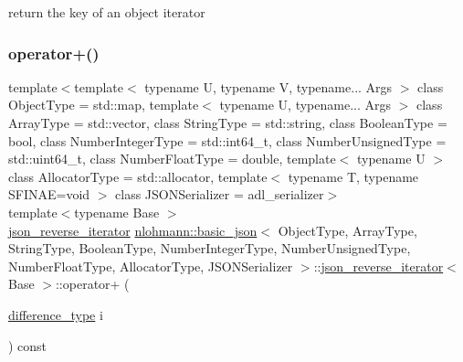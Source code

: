 return the key of an object iterator 

\mbox{\label{classnlohmann_1_1basic__json_1_1json__reverse__iterator_a87a33e1b5bf42674ebe9c43ac41f8660}} 
\subsubsection{\texorpdfstring{operator+()}{operator+()}}
{\footnotesize\ttfamily template$<$template$<$ typename U, typename V, typename... Args $>$ class Object\+Type = std\+::map, template$<$ typename U, typename... Args $>$ class Array\+Type = std\+::vector, class String\+Type  = std\+::string, class Boolean\+Type  = bool, class Number\+Integer\+Type  = std\+::int64\+\_\+t, class Number\+Unsigned\+Type  = std\+::uint64\+\_\+t, class Number\+Float\+Type  = double, template$<$ typename U $>$ class Allocator\+Type = std\+::allocator, template$<$ typename T, typename S\+F\+I\+N\+A\+E=void $>$ class J\+S\+O\+N\+Serializer = adl\+\_\+serializer$>$ \\
template$<$typename Base $>$ \\
\mbox{\hyperlink{classnlohmann_1_1basic__json_1_1json__reverse__iterator}{json\+\_\+reverse\+\_\+iterator}} \mbox{\hyperlink{classnlohmann_1_1basic__json}{nlohmann\+::basic\+\_\+json}}$<$ Object\+Type, Array\+Type, String\+Type, Boolean\+Type, Number\+Integer\+Type, Number\+Unsigned\+Type, Number\+Float\+Type, Allocator\+Type, J\+S\+O\+N\+Serializer $>$\+::\mbox{\hyperlink{classnlohmann_1_1basic__json_1_1json__reverse__iterator}{json\+\_\+reverse\+\_\+iterator}}$<$ Base $>$\+::operator+ (\begin{DoxyParamCaption}\item[{\mbox{\hyperlink{classnlohmann_1_1basic__json_afe7c1303357e19cea9527af4e9a31d8f}{difference\+\_\+type}}}]{i }\end{DoxyParamCaption}) const\hspace{0.3cm}{\ttfamily [inline]}}



